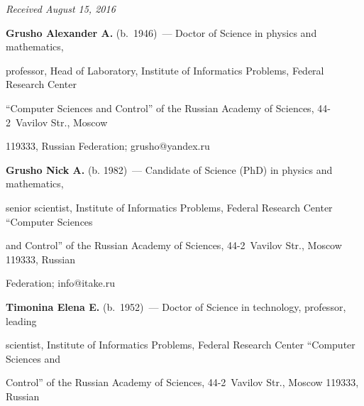 \vspace*{-3pt}





\hfill{\small\textit{Received August 15, 2016}}





    


    \Contr


    


    \noindent


    \textbf{Grusho Alexander A.} (b.\ 1946)~--- Doctor of Science in physics and mathematics, 


professor, Head of Laboratory, Institute of Informatics Problems, Federal Research Center 


``Computer Sciences and Control'' of the Russian Academy of Sciences, 44-2~Vavilov Str., Moscow 


119333, Russian Federation; \mbox{grusho@yandex.ru}   


     


     \vspace*{3pt}


     


     \noindent


     \textbf{Grusho Nick A.} (b. 1982)~--- Candidate of Science (PhD) in physics and mathematics, 


senior scientist, Institute of Informatics Problems, Federal Research Center ``Computer Sciences 


and Control'' of the Russian Academy of Sciences, 44-2~Vavilov Str., Moscow 119333, Russian 


Federation; \mbox{info@itake.ru}


       


     \vspace*{3pt}


     


     \noindent


\textbf{Timonina Elena E.} (b.\ 1952)~--- Doctor of Science in technology, professor, leading 


scientist, Institute of Informatics Problems, Federal Research Center ``Computer Sciences and 


Control'' of the Russian Academy of Sciences, 44-2~Vavilov Str., Moscow 119333, Russian 


